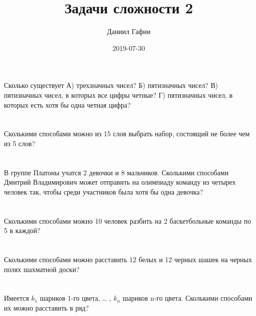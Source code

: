 \documentclass{article}%
\title{Задачи сложности 2}%
\author{Даниил Гафни}%
\date{2019{-}07{-}30}%
\begin{document}
%
\normalsize%
\maketitle%
\section{}%
\label{sec:}%
Сколько существует
А) трехзначных чисел?
Б) пятизначных чисел?
В) пятизначных чисел, в которых все цифры четные?
Г) пятизначных чисел, в которых есть хотя бы одна четная цифра?%
%
\iffalse%
Автор: Ираклий Гагуа%
Дата: 07{-}01{-}2011%
Название: None%
Подсказка: \textbackslash{}\textbackslash{}%
nan%
\fi

%
\section{}%
\label{sec:}%
Сколькими способами можно из 15 слов выбрать набор, состоящий не более чем
из 5 слов?%
%
\iffalse%
Автор: 25 школа%
Дата: 01{-}07{-}2017%
Название: None%
Подсказка: \textbackslash{}\textbackslash{}%
nan%
\fi

%
\section{}%
\label{sec:}%
В группе Платоны учатся 2 девочки и 8 мальчиков. Сколькими способами
Дмитрий Владимирович может отправить на олимпиаду команду из четырех человек
так, чтобы среди участников была хотя бы одна девочка?%
%
\iffalse%
Автор: 25 школа%
Дата: 01{-}07{-}2017%
Название: None%
Подсказка: \textbackslash{}\textbackslash{}%
nan%
\fi

%
\section{}%
\label{sec:}%
Сколькими способами можно 10 человек разбить на 2 баскетбольные команды
по 5 в каждой?%
%
\iffalse%
Автор: 25 школа%
Дата: 01{-}07{-}2017%
Название: None%
Подсказка: \textbackslash{}\textbackslash{}%
nan%
\fi

%
\section{}%
\label{sec:}%
Сколькими способами можно расставить 12 белых и 12 черных шашек на черных
полях шахматной доски?%
%
\iffalse%
Автор: 25 школа%
Дата: 01{-}07{-}2017%
Название: None%
Подсказка: \textbackslash{}\textbackslash{}%
nan%
\fi

%
\section{}%
\label{sec:}%
Имеется $k_1$ шариков 1-го цвета, … , $k_n$ шариков n-го цвета. Сколькими способами их можно расставить в ряд?%
%
\iffalse%
Автор: Ираклий Гагуа%
Дата: 07{-}01{-}2011%
Название: None%
Подсказка: \textbackslash{}\textbackslash{}%
nan%
\fi
\end{document}
